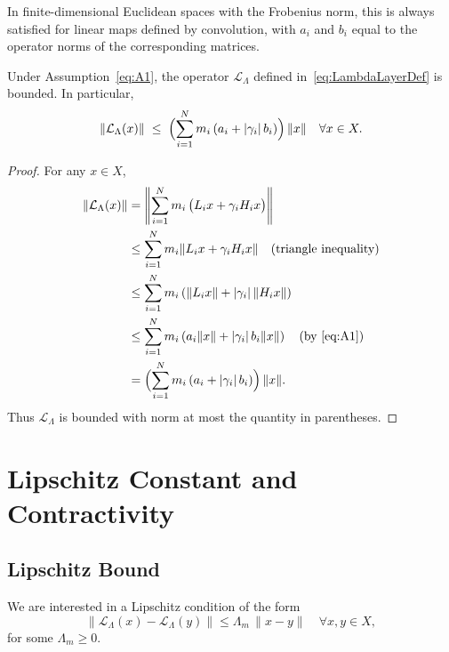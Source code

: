 \documentclass[11pt]{article}
\begin{document}
In finite-dimensional Euclidean spaces with the Frobenius norm, this is always satisfied for linear maps defined by convolution, with $a_i$ and $b_i$ equal to the operator norms of the corresponding matrices.

\begin{lemma}[Boundedness]\label{lem:bounded}
Under Assumption~\eqref{eq:A1}, the operator $\mathcal{L}_\Lambda$ defined in~\eqref{eq:LambdaLayerDef} is bounded. In particular,
\begin{equation}
  \|\mathcal{L}_\Lambda(x)\|
  \;\le\;
  \Bigl(\sum_{i=1}^N m_i\,(a_i + |\gamma_i|\,b_i)\Bigr)\,\|x\|
  \quad\forall x\in X.
  \label{eq:LipUpperBasic}
\end{equation}
\end{lemma}

\begin{proof}
For any $x\in X$,
\begin{align*}
  \|\mathcal{L}_\Lambda(x)\|
  &= \left\|\sum_{i=1}^N m_i\,\bigl(L_i x + \gamma_i H_i x\bigr)\right\|\\
  &\le \sum_{i=1}^N m_i \|L_i x + \gamma_i H_i x\|
       \quad\text{(triangle inequality)}\\
  &\le \sum_{i=1}^N m_i \left(\|L_i x\| + |\gamma_i|\,\|H_i x\|\right)\\
  &\le \sum_{i=1}^N m_i\left(a_i\|x\| + |\gamma_i|\,b_i\|x\|\right)
       \quad\text{(by \eqref{eq:A1})}\\
  &= \Bigl(\sum_{i=1}^N m_i\,(a_i + |\gamma_i|\,b_i)\Bigr)\,\|x\|.
\end{align*}
Thus $\mathcal{L}_\Lambda$ is bounded with norm at most the quantity in parentheses.
\end{proof}

\section{Lipschitz Constant and Contractivity}

\subsection{Lipschitz Bound}

We are interested in a Lipschitz condition of the form
\begin{equation}
  \|\mathcal{L}_\Lambda(x) - \mathcal{L}_\Lambda(y)\|
  \le \Lambda_m \,\|x-y\|
  \quad\forall x,y\in X,
  \label{eq:LipDefAppendix}
\end{equation}
for some $\Lambda_m\ge 0$.
\end{document}
